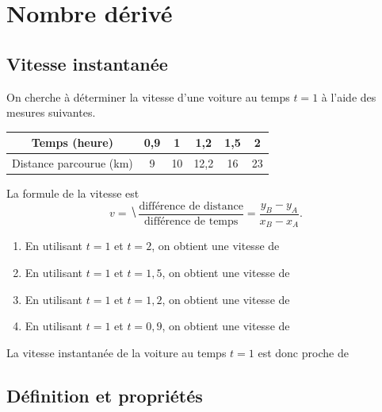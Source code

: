 \section{Nombre dérivé}

\subsection{Vitesse instantanée}

\begin{exemple*}

On cherche à déterminer la vitesse d'une voiture au temps $t=1$ à l'aide des mesures suivantes.

\begin{center}
\begin{tabular}{|*{6}{c|}}\hline
	Temps (heure) & 0,9 & 1 & 1,2 & 1,5 & 2
	\\\hline
	Distance parcourue (km) & 9 & 10 & 12,2 & 16 & 23
	\\\hline
\end{tabular}
\end{center}

La formule de la vitesse est 
	\[ v = \hide{\dfrac{\text{différence de distance}}{\text{différence de temps}} = \dfrac{y_B-y_A}{x_B-x_A}.} \]

\begin{enumerate}[leftmargin=50pt]
	\item
	En utilisant $t=1$ et $t=2$, on obtient une vitesse de 
	
	\item
	En utilisant $t=1$ et $t=1,5$, on obtient une vitesse de 
	
	\item
	En utilisant $t=1$ et $t=1,2$, on obtient une vitesse de 
	
	\item
	En utilisant $t=1$ et $t=0,9$, on obtient une vitesse de 
	
\end{enumerate}

La vitesse instantanée de la voiture au temps $t=1$ est donc proche de 

\end{exemple*}

\subsection{Définition et propriétés}

